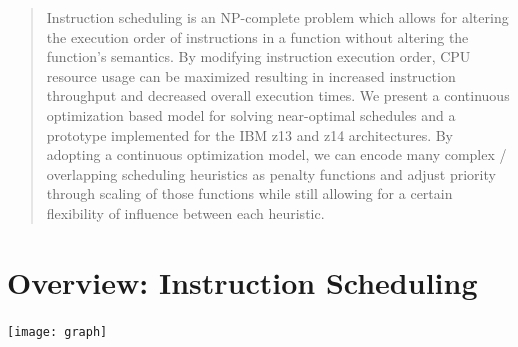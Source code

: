 \documentclass[a0,landscape,24pt]{a0poster}
\begin{document}
\vspace{1cm} %


\begin{multicols}{3} %


\color{Navy} %

\begin{abstract}

Instruction scheduling is an NP-complete problem which allows for altering the execution order of instructions in a function without altering the function's semantics. By modifying instruction execution order, CPU resource usage can be maximized resulting in increased instruction throughput and decreased overall execution times. We present a continuous optimization based model for solving near-optimal schedules and a prototype implemented for the IBM z13 and z14 architectures. By adopting a continuous optimization model, we can encode many complex / overlapping scheduling heuristics as penalty functions and adjust priority through scaling of those functions while still allowing for a certain flexibility of influence between each heuristic.


\end{abstract}


\color{SaddleBrown} %

\section*{Overview: Instruction Scheduling}

\begin{center}\vspace{1cm}
\texttt{[image: graph]}
\end{center}\vspace{1cm}


\end{multicols}
\end{document}
